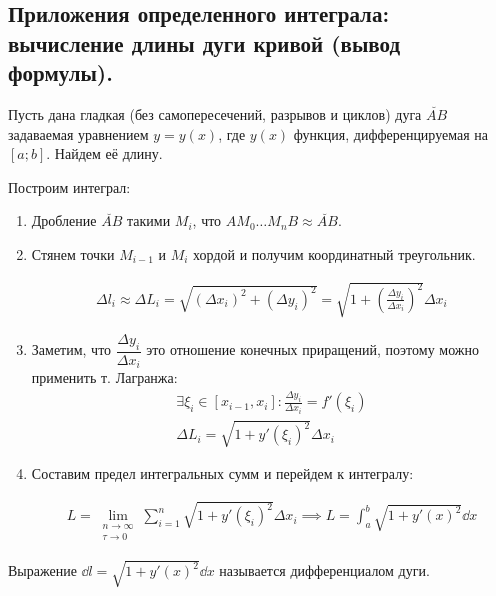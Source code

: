 \subsection{%
  Приложения определенного интеграла: вычисление длины дуги кривой (вывод
  формулы).%
}

Пусть дана гладкая (без самопересечений, разрывов и циклов) дуга \(\breve{AB}\)
задаваемая уравнением \(y = y(x)\), где \(y(x)\) функция, дифференцируемая на
\([a; b]\). Найдем её длину.

Построим интеграл:
\begin{enumerate}
  \item Дробление \(\breve{AB}\) такими \(M_{i}\), что
  \(A M_{0} \dotsc M_{n} B \approx \breve{AB}\).

  \item Стянем точки \(M_{i - 1}\) и \(M_{i}\) хордой и получим координатный
  треугольник.

  \begin{twocolumns}
    \begin{align*}
      \Delta l_{i}
      \approx \Delta L_{i}
      = \sqrt{(\Delta x_{i})^2 + (\Delta y_{i})^2}
      = \sqrt{1 + \left(\frac{\Delta y_{i}}{\Delta x_{i}}\right)^2} \Delta x_{i}
    \end{align*}
    \columnbreak

    
  \end{twocolumns}

  \item Заметим, что \(\dfrac{\Delta y_{i}}{\Delta x_{i}}\) это отношение
  конечных приращений, поэтому можно применить т. Лагранжа:
  \begin{align*}
    \exists \xi_{i} \in [x_{i - 1}, x_{i}] \colon
      \frac{\Delta y_{i}}{\Delta x_{i}} = f'(\xi_{i})
    \\
    \Delta L_{i}
    = \sqrt{1 + y'(\xi_{i})^2} \Delta x_{i}
  \end{align*}
  
  \item Составим предел интегральных сумм и перейдем к интегралу:

  \begin{align*}
    L = \lim_{\substack{n \to \infty \\ \tau \to 0}}
      \sum_{i = 1}^{n} \sqrt{1 + y'(\xi_{i})^2} \Delta x_{i}
    \implies L = \int_{a}^{b} \sqrt{1 + y'(x)^2} \dd x
  \end{align*}
\end{enumerate}

\begin{remark}\label{arc-diff}
  Выражение \(\dd l = \sqrt{1 + y'(x)^2} \dd x\) называется дифференциалом дуги.
\end{remark}
